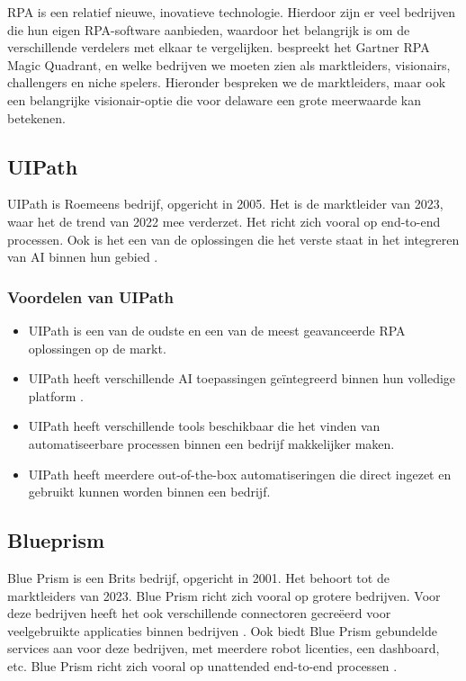 RPA is een relatief nieuwe, inovatieve technologie. Hierdoor zijn er veel bedrijven die hun eigen RPA-software aanbieden, waardoor het belangrijk is om de verschillende verdelers met elkaar te vergelijken. \textcite{Carter2023} bespreekt het Gartner RPA Magic Quadrant, en welke bedrijven we moeten zien als marktleiders, visionairs, challengers en niche spelers. Hieronder bespreken we de marktleiders, maar ook een belangrijke visionair-optie die voor delaware een grote meerwaarde kan betekenen.

\subsection{UIPath}

UIPath is Roemeens bedrijf, opgericht in 2005. Het is de marktleider van 2023, waar het de trend van 2022 mee verderzet. Het richt zich vooral op end-to-end processen. Ook is het een van de oplossingen die het verste staat in het integreren van AI binnen hun gebied \autocite{GartnerUIPath2023}.

\subsubsection{Voordelen van UIPath}

\begin{itemize}
    \item UIPath is een van de oudste en een van de meest geavanceerde RPA oplossingen op de markt.
    \item UIPath heeft verschillende AI toepassingen geïntegreerd binnen hun volledige platform \autocite{Liliana2022}.
    \item UIPath heeft verschillende tools beschikbaar die het vinden van automatiseerbare processen binnen een bedrijf makkelijker maken.
    \item UIPath heeft meerdere out-of-the-box automatiseringen die direct ingezet en gebruikt kunnen worden binnen een bedrijf.
\end{itemize}


\subsection{Blueprism}

Blue Prism is een Brits bedrijf, opgericht in 2001. Het behoort tot de marktleiders van 2023. Blue Prism richt zich vooral op grotere bedrijven. Voor deze bedrijven heeft het ook verschillende connectoren gecreëerd voor veelgebruikte applicaties binnen bedrijven \autocite{GartnerBluePrism2023}. Ook biedt Blue Prism gebundelde services aan voor deze bedrijven, met meerdere robot licenties, een dashboard, etc. Blue Prism richt zich vooral op unattended end-to-end processen \autocite{Laxmikant2023}.


